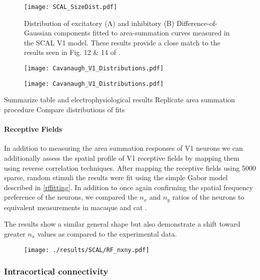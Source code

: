 \begin{figure}
	\centering
        \texttt{[image: SCAL\_SizeDist.pdf]}
	\caption{Distribution of excitatory (A) and inhibitory (B)
          Difference-of-Gaussian components fitted to area-summation
          curves measured in the SCAL V1 model. These results provide
          a close match to the results seen in Fig. 12 \& 14 of
          \cite{Sceniak2001}.}
	\label{SCALSizeDist}
\end{figure}


\begin{figure}
	\centering
        \texttt{[image: Cavanaugh\_V1\_Distributions.pdf]}
	\caption{}
	\label{CavanaughDistribution}
\end{figure}

\begin{figure}
	\centering
        \texttt{[image: Cavanaugh\_V1\_Distributions.pdf]}
	\caption{}
	\label{CavanaughDistribution}
\end{figure}

Summarize table and electrophysiological results
Replicate area summation procedure
Compare distributions of fits

\paragraph{Receptive Fields}

In addition to measuring the area summation responses of V1 neurons we
can additionally assess the spatial profile of V1 receptive fields by
mapping them using reverse correlation techniques. After mapping the
receptive fields using 5000 sparse, random stimuli the results were
fit using the simple Gabor model described in \ref{rffitting}. In
addition to once again confirming the spatial frequency preference of
the neurons, we compared the $n_x$ and $n_y$ ratios of the neurons to
equivalent measurements in macaque \citep{Ringach2002b} and cat
\citep{Jones1987}.

The results show a similar general shape but also demonstrate a shift
toward greater $n_x$ values as compared to the experimental data.

\begin{figure}
	\centering
        \texttt{[image: ./results/SCAL/RF\_nxny.pdf]}
	\caption{}
	\label{RFFits}
\end{figure}


\subsubsection{Intracortical connectivity}

